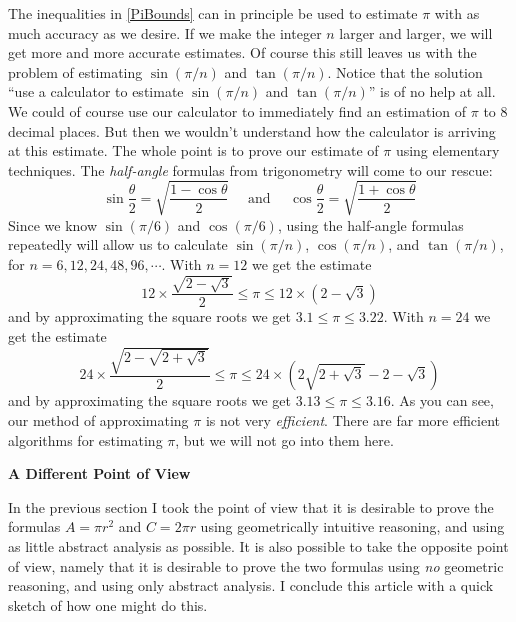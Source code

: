 \documentclass[twoside,twocolumn,12pt]{amsart}
\theoremstyle{plain}
\theoremstyle{definition}
\newcommand{\skipsmall}{\vspace{1em}}
\begin{document}
The inequalities in \ref{PiBounds} can in principle be used to estimate
$\pi$ with as much accuracy as we desire. If we make the integer $n$ larger
and larger, we will get more and more accurate estimates. Of course this
still leaves us with the problem of estimating $\sin(\pi/n)$ and
$\tan(\pi/n)$. Notice that the solution ``use a calculator to estimate
$\sin(\pi/n)$ and $\tan(\pi/n)$'' is of no help at all. We could of course
use our calculator to immediately
find an estimation of $\pi$ to 8 decimal places. But
then we wouldn't understand how the calculator is arriving at this estimate.
The whole point is to prove
 our estimate of $\pi$ using elementary techniques.
The \emph{half-angle} formulas from trigonometry will come to our
rescue:
$$
\sin\frac{\theta}{2}=\sqrt{\frac{1-\cos\theta}{2}}
\quad\text{ and }\quad
\cos\frac{\theta}{2}=\sqrt{\frac{1+\cos\theta}{2}}
$$
Since we know $\sin(\pi/6)$ and $\cos(\pi/6)$, using the half-angle
formulas repeatedly will allow us to calculate $\sin(\pi/n)$,
$\cos(\pi/n)$, and $\tan(\pi/n)$, for $n=6,12,24,48,96,\cdots$.
With $n=12$ we get the estimate
$$12\times\frac{\sqrt{2-\sqrt{3}}}{2}\leq\pi\leq 12\times(2-\sqrt{3})$$
and by approximating the square roots we get $3.1\leq\pi\leq 3.22$.
With $n=24$ we get the estimate
$$24\times\frac{\sqrt{2-\sqrt{2+\sqrt{3}}}}{2}\leq\pi
\leq 24\times\left(2\sqrt{2+\sqrt{3}}-2-\sqrt{3}\right)$$
and by approximating the square roots we get
$3.13\leq\pi\leq 3.16$. As you can see, our method of approximating
$\pi$ is not very \emph{efficient}. There are far more efficient
algorithms for estimating $\pi$, but we will not go into them here.

\skipsmall

\noindent
\textbf{\large A Different Point of View}

\skipsmall

In the previous section I took the point of view that it is desirable to
prove
the formulas $A=\pi r^2$ and $C=2\pi r$ using geometrically intuitive
reasoning, and using as little abstract analysis as possible. It is
also possible to take the opposite point of view, namely that it is
desirable to prove the two formulas using \emph{no} geometric reasoning,
and using only abstract analysis. I conclude this article with a quick
sketch of how one might do this.
\end{document}
